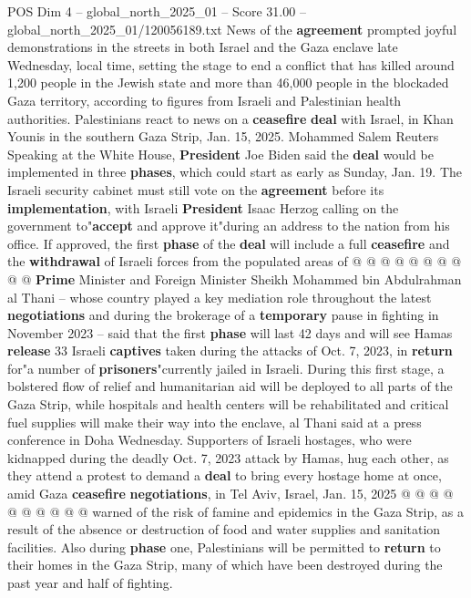 \begin{textsample}{POS Dim 4 – global\_north\_2025\_01 – Score 31.00 – global\_north\_2025\_01/120056189.txt}  \label{ex:f4_pos_041}
News of the \textbf{agreement} prompted joyful demonstrations in the streets in both Israel and the Gaza enclave late Wednesday, local time, setting the stage to end a conflict that has killed around 1,200 people in the Jewish state and more than 46,000 people in the blockaded Gaza territory, according to figures from Israeli and Palestinian health authorities.
Palestinians react to news on a \textbf{ceasefire} \textbf{deal} with Israel, in Khan Younis in the southern Gaza Strip, Jan. 15, 2025.
Mohammed Salem Reuters Speaking at the White House, \textbf{President} Joe Biden said the \textbf{deal} would be implemented in three \textbf{phases}, which could start as early as Sunday, Jan. 19.
The Israeli security cabinet must still vote on the \textbf{agreement} before its \textbf{implementation}, with Israeli \textbf{President} Isaac Herzog calling on the government to"\textbf{accept} and approve it"during an address to the nation from his office.
If approved, the first \textbf{phase} of the \textbf{deal} will include a full \textbf{ceasefire} and the \textbf{withdrawal} of Israeli forces from the populated areas of @ @ @ @ @ @ @ @ @ @ \textbf{Prime} Minister and Foreign Minister Sheikh Mohammed bin Abdulrahman al Thani -- whose country played a key mediation role throughout the latest \textbf{negotiations} and during the brokerage of a \textbf{temporary} pause in fighting in November 2023 -- said that the first \textbf{phase} will last 42 days and will see Hamas \textbf{release} 33 Israeli \textbf{captives} taken during the attacks of Oct. 7, 2023, in \textbf{return} for"a number of \textbf{prisoners}"currently jailed in Israeli.
During this first stage, a bolstered flow of relief and humanitarian aid will be deployed to all parts of the Gaza Strip, while hospitals and health centers will be rehabilitated and critical fuel supplies will make their way into the enclave, al Thani said at a press conference in Doha Wednesday.
Supporters of Israeli hostages, who were kidnapped during the deadly Oct. 7, 2023 attack by Hamas, hug each other, as they attend a protest to demand a \textbf{deal} to bring every hostage home at once, amid Gaza \textbf{ceasefire} \textbf{negotiations}, in Tel Aviv, Israel, Jan. 15, 2025 @ @ @ @ @ @ @ @ @ @ warned of the risk of famine and epidemics in the Gaza Strip, as a result of the absence or destruction of food and water supplies and sanitation facilities.
Also during \textbf{phase} one, Palestinians will be permitted to \textbf{return} to their homes in the Gaza Strip, many of which have been destroyed during the past year and half of fighting.

\end{textsample}
